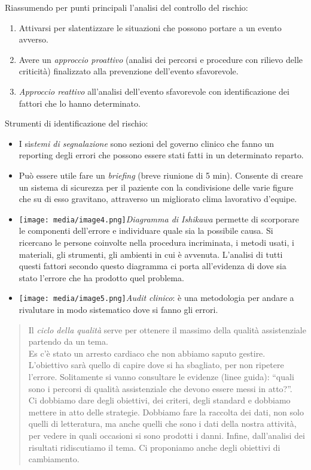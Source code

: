 \documentclass[]{article}
\begin{document}
Riassumendo per punti principali l'analisi del controllo del rischio:

\begin{enumerate}
\def\labelenumi{\arabic{enumi}.}
\item
  Attivarsi per slatentizzare le situazioni che possono portare a un
  evento avverso.
\item
  Avere un \emph{approccio proattivo} (analisi dei percorsi e procedure
  con rilievo delle criticità) finalizzato alla prevenzione dell'evento
  sfavorevole.
\item
  \emph{Approccio reattivo} all'analisi dell'evento sfavorevole con
  identificazione dei fattori che lo hanno determinato.
\end{enumerate}

Strumenti di identificazione del rischio:

\begin{itemize}
\item
  I sis\emph{temi di segnalazione} sono sezioni del governo clinico che
  fanno un reporting degli errori che possono essere stati fatti in un
  determinato reparto.
\item
  Può essere utile fare un \emph{briefing} (breve riunione di 5 min).
  Consente di creare un sistema di sicurezza per il paziente con la
  condivisione delle varie figure che su di esso gravitano, attraverso
  un migliorato clima lavorativo d'equipe.
\item
  \texttt{[image: media/image4.png]}\emph{Diagramma
  di Ishikawa} permette di scorporare le componenti dell'errore e
  individuare quale sia la possibile causa. Si ricercano le persone
  coinvolte nella procedura incriminata, i metodi usati, i materiali,
  gli strumenti, gli ambienti in cui è avvenuta. L'analisi di tutti
  questi fattori secondo questo diagramma ci porta all'evidenza di dove
  sia stato l'errore che ha prodotto quel problema.
\item
  \texttt{[image: media/image5.png]}\emph{Audit
  clinico}: è una metodologia per andare a rivalutare in modo
  sistematico dove si fanno gli errori.
\end{itemize}

\begin{quote}
Il \emph{ciclo della qualità} serve per ottenere il massimo della
qualità assistenziale partendo da un tema.\\
Es c'è stato un arresto cardiaco che non abbiamo saputo gestire.
L'obiettivo sarà quello di capire dove si ha sbagliato, per non ripetere
l'errore. Solitamente si vanno consultare le evidenze (linee guida):
``quali sono i percorsi di qualità assistenziale che devono essere messi
in atto?''.\\
Ci dobbiamo dare degli obiettivi, dei criteri, degli standard e dobbiamo
mettere in atto delle strategie. Dobbiamo fare la raccolta dei dati, non
solo quelli di letteratura, ma anche quelli che sono i dati della nostra
attività, per vedere in quali occasioni si sono prodotti i danni.
Infine, dall'analisi dei risultati ridiscutiamo il tema. Ci proponiamo
anche degli obiettivi di cambiamento.
\end{quote}
\end{document}
